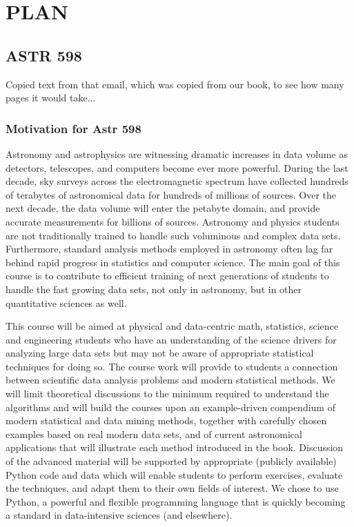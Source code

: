 \section{{\bf PLAN}}



\subsection{ASTR 598} 

Copied text from that email, which was copied from our book, to see
how many pages it would take...

\subsubsection{Motivation for Astr 598}

Astronomy and astrophysics are witnessing dramatic increases in data volume 
as detectors, telescopes, and computers become ever more powerful. During the 
last decade, sky surveys across the electromagnetic spectrum have collected 
hundreds of terabytes of astronomical data for hundreds of millions of sources. 
Over the next decade, the data volume will enter the petabyte domain, and provide 
accurate measurements for billions of sources. Astronomy and physics students 
are not traditionally trained to handle such voluminous and complex data sets. 
Furthermore, standard analysis methods employed in astronomy often lag far 
behind rapid progress in statistics and computer science. The main
goal of this course is to contribute to efficient training of next
generations of students to 
handle the fast growing data sets, not only in astronomy, but in other quantitative 
sciences as well. 

This course will be aimed at physical and data-centric math,
statistics, science and engineering students
who have an understanding of the science drivers for analyzing large data sets but 
may not be aware of appropriate statistical techniques for doing so. The course work 
will provide to students a connection between scientific data analysis problems and 
modern statistical methods. We will limit theoretical discussions to the minimum 
required to understand the algorithms and will build the courses upon an 
example-driven compendium of modern statistical and data mining methods, 
together with carefully chosen examples based on real modern data sets, and of 
current astronomical applications that will illustrate each method introduced in the 
book. Discussion of the advanced material will be supported by appropriate (publicly 
available) Python code and data which will enable students to perform exercises, 
evaluate the techniques, and adapt them to their own fields of interest. We chose to 
use Python, a powerful and flexible programming language that is quickly becoming 
a standard in data-intensive sciences (and elsewhere). 

